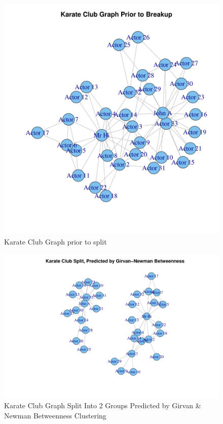 \begin{figure}[h]
\includegraphics[scale=0.6]{R/kclub.pdf}
\caption{Karate Club Graph prior to split}
\label{fig:karate-before-split}
\end{figure}

\begin{figure}[h]
\includegraphics[scale=0.6]{R/kclub-into2.pdf}
\caption{Karate Club Graph Split Into 2 Groups Predicted by Girvan \& Newman Betweenness Clustering}
\label{fig:karate-after-split}
\end{figure}







